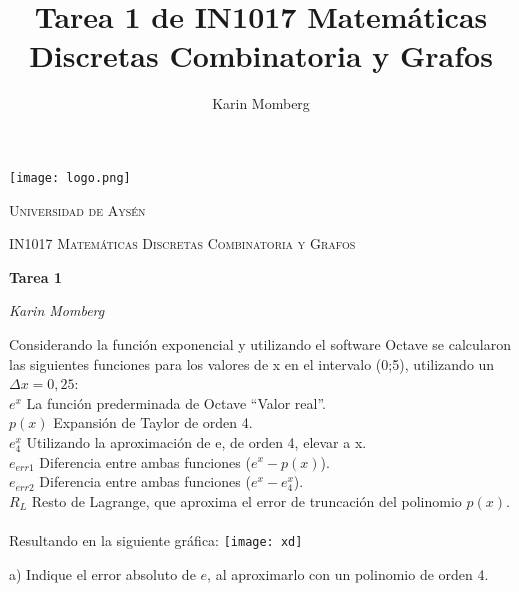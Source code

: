 \documentclass[]{article}
\title{Tarea 1 de IN1017 Matemáticas Discretas Combinatoria y Grafos}
\author{Karin Momberg}
\begin{document}
\begin{titlepage}
		\centering
		\texttt{[image: logo.png]}\par\vspace{1cm}
		{\scshape\LARGE Universidad de Aysén \par}
		\vspace{1cm}
		{\scshape\Large IN1017 Matemáticas Discretas Combinatoria y Grafos\par}
		\vspace{1.5cm}
		{\huge\bfseries Tarea 1\par}
		\vspace{2cm}
		{\Large\itshape Karin Momberg\par}
		
		\vfill
		{\large \Today\par}
	\end{titlepage}

Considerando la función exponencial y utilizando el software Octave se calcularon las siguientes funciones para los valores de x en el intervalo (0;5), utilizando un $\Delta x = 0,25$: \\
$e^{x}$ \hspace{5mm} La función prederminada de Octave “Valor real”. \\
$p(x)$ \hspace{2mm} Expansión de Taylor de orden 4. \\
$e^{x}_{4}$ \hspace{5mm} Utilizando la aproximación de e, de orden 4, elevar a x. \\
$e_{err1}$ \hspace{1mm} Diferencia entre ambas funciones ($e^{x} - p(x)$). \\
$e_{err2}$ \hspace{1mm} Diferencia entre ambas funciones ($e^{x} - e^{x}_{4}$). \\
$R_{L}$ \hspace{3mm} Resto de Lagrange, que aproxima el error de truncación del polinomio $p(x)$. \\\\
Resultando en la siguiente gráfica: 
\texttt{[image: xd]}



a) Indique el error absoluto de $e$, al aproximarlo con un polinomio de orden 4. \\\\
\end{document}
